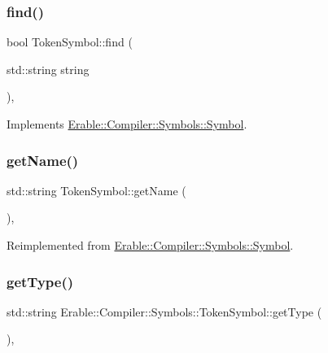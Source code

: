 \subsubsection{\texorpdfstring{find()}{find()}}
{\footnotesize\ttfamily bool Token\+Symbol\+::find (\begin{DoxyParamCaption}\item[{std\+::string}]{string }\end{DoxyParamCaption})\hspace{0.3cm}{\ttfamily [override]}, {\ttfamily [virtual]}}



Implements \mbox{\hyperlink{class_erable_1_1_compiler_1_1_symbols_1_1_symbol_ac1d8b1392aef2e93bd47520a86f8617f}{Erable\+::\+Compiler\+::\+Symbols\+::\+Symbol}}.

\mbox{\label{class_erable_1_1_compiler_1_1_symbols_1_1_token_symbol_a2d9a65967a330721741d7f13ec299745}} 
\subsubsection{\texorpdfstring{getName()}{getName()}}
{\footnotesize\ttfamily std\+::string Token\+Symbol\+::get\+Name (\begin{DoxyParamCaption}{ }\end{DoxyParamCaption})\hspace{0.3cm}{\ttfamily [override]}, {\ttfamily [virtual]}}



Reimplemented from \mbox{\hyperlink{class_erable_1_1_compiler_1_1_symbols_1_1_symbol_a71aeae736d2ec43f0880341d53bbcc2c}{Erable\+::\+Compiler\+::\+Symbols\+::\+Symbol}}.

\mbox{\label{class_erable_1_1_compiler_1_1_symbols_1_1_token_symbol_ab80bcf5e531cee5fbb5fe798449e4cbb}} 
\subsubsection{\texorpdfstring{getType()}{getType()}}
{\footnotesize\ttfamily std\+::string Erable\+::\+Compiler\+::\+Symbols\+::\+Token\+Symbol\+::get\+Type (\begin{DoxyParamCaption}{ }\end{DoxyParamCaption})\hspace{0.3cm}{\ttfamily [override]}, {\ttfamily [virtual]}}



